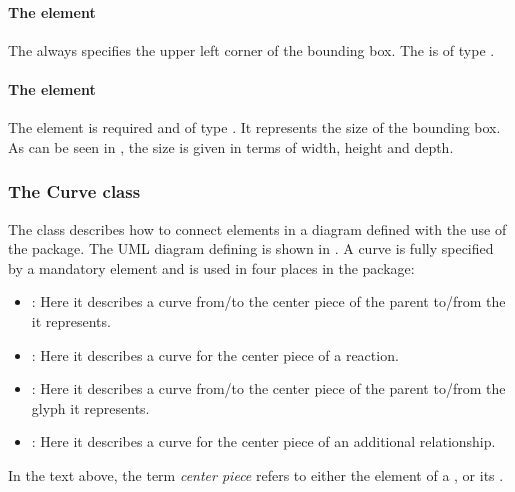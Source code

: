 \paragraph{The  element} The  always 
specifies the upper left corner of the bounding box. The 
is of type \Point. 

\paragraph{The  element} The  
element is required and of type \Dimensions. It represents the size of
the bounding box. As can be seen in , the size is given
in terms of width, height and depth.

\subsubsection{The Curve class} \label{curve-class} The \Curve class 
describes how to connect elements in a diagram defined with the use of the
\Layout package.  The UML diagram defining \Curve is shown in
.  A curve is fully specified by a mandatory
 element and is used in four places in the \Layout
package:

\begin{itemize}

	\item \SpeciesReferenceGlyph: Here it describes a curve from/to 
	the center piece of the parent \ReactionGlyph to/from the 
	\SpeciesGlyph it represents.

	\item \ReactionGlyph: Here it describes a curve for the 
	center piece of a reaction.

	\item \ReferenceGlyph: Here it describes a curve from/to 
	the center piece of the parent \GeneralGlyph to/from the glyph 
	it represents.

	\item \GeneralGlyph: Here it describes a curve for the 
	center piece of an additional relationship.
	
\end{itemize}

In the text above, the term \textit{center piece} refers to either the \Curve 
element of a \ReactionGlyph, or its \BoundingBox. 

